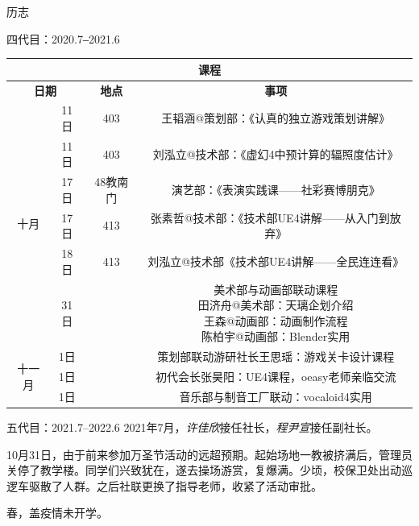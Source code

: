 \documentclass{paper}
\newcommand{\name}[1]{{\em #1}}
\renewcommand{\thead}[1]{\textbf{ #1}}
\begin{document}
\begin{section}{历志}
\begin{subsection}{四代目：2020.7‒2021.6}
		\begin{table}[H]\begin{center}
			\begin{tabular}{|c|c|c|c|}
				\hline
				\multicolumn{4}{|c|}{\thead{课程}} \\ \hline
				\multicolumn{2}{|c|}{\thead{日期}} & \thead{地点} & \thead{事项} \\ \hline
				\multirow{6}{*}{十月}
				& 11日 & 403 & 王韬涵@策划部：《认真的独立游戏策划讲解》 \\
				& 11日 & 403 & 刘泓立@技术部：《虚幻4中预计算的辐照度估计》 \\
				& 17日 & 48教南门 & 演艺部：《表演实践课——社彩赛博朋克》 \\
				& 17日 & 413 & 张素哲@技术部：《技术部UE4讲解——从入门到放弃》 \\
				& 18日 & 413 & 刘泓立@技术部《技术部UE4讲解——全民连连看》 \\
				& 31日 & & \makecell{
					美术部与动画部联动课程 \\
					田济舟@美术部：天璃企划介绍 \\
					王森@动画部：动画制作流程 \\
					陈柏宇@动画部：Blender实用
				} \\ \hline
				\multirow{3}{*}{十一月}
				& 1日 & & 策划部联动游研社长王思瑶：游戏关卡设计课程 \\
				& 1日 & & 初代会长张昊阳：UE4课程，oeasy老师亲临交流 \\
				& 1日 & & 音乐部与制音工厂联动：vocaloid4实用 \\ \hline
			\end{tabular}
		\end{center}\end{table}
	\end{subsection}
	\begin{subsection}{五代目：2021.7--2022.6}
		2021年7月，\name{许佳欣}接任社长，\name{程尹宣}接任副社长。

		10月31日，由于前来参加万圣节活动的远超预期。起始场地一教被挤满后，管理员关停了教学楼。同学们兴致犹在，遂去操场游赏，复爆满。少顷，校保卫处出动巡逻车驱散了人群。之后社联更换了指导老师，收紧了活动审批。

		春，盖疫情未开学。


\end{subsection}
\end{section}
\end{document}
